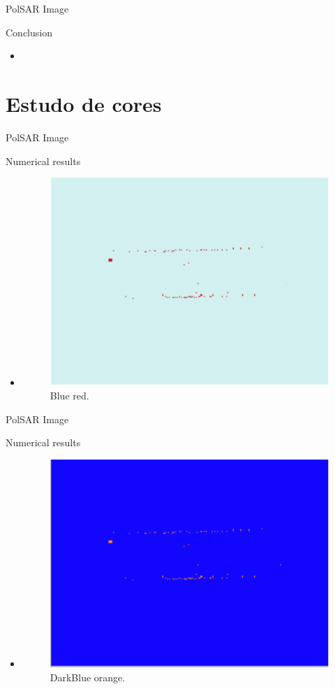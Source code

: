 \documentclass[10pt]{beamer}
\begin{document}
\begin{frame}[fragile]{PolSAR Image}
\begin{alertblock}{Conclusion}
\begin{itemize}
	\item 
\end{itemize}
\end{alertblock}
\end{frame}

\section{Estudo de cores}

\begin{frame}[fragile]{PolSAR Image}
\begin{alertblock}{Numerical results}
\begin{itemize}
	\item 
	\begin{figure}[hbt]
\centering
	\includegraphics[width=.5\linewidth]{flevoland_fusao_roc_crop_teste_blue_red}
	\caption{Blue red.}
\label{flevoland_radial_4look}
\end{figure}
\end{itemize}
\end{alertblock}
\end{frame}
\begin{frame}[fragile]{PolSAR Image}
\begin{alertblock}{Numerical results}
\begin{itemize}
	\item 
	\begin{figure}[hbt]
\centering
	\includegraphics[width=.5\linewidth]{flevoland_fusao_roc_crop_teste_darkblue_orange}
	\caption{DarkBlue orange.}
\label{flevoland_radial_4look}
\end{figure}
\end{itemize}
\end{alertblock}
\end{frame}
\end{document}
